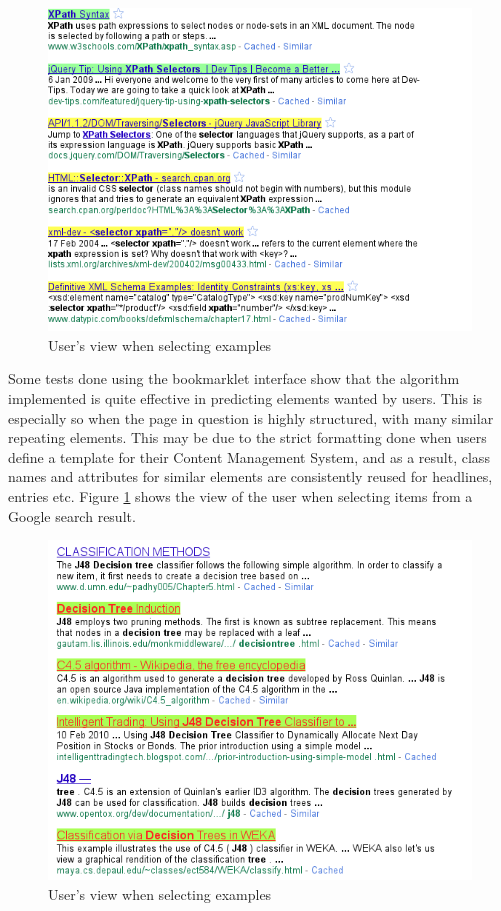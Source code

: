 \documentclass[a4paper,12pt]{article}
\begin{document}
\begin{figure}[htbp]
\centering
\includegraphics[scale=0.5]{selectorexample.png} 
\caption{User's view when selecting examples}
\label{fig:selectorexample}
\end{figure}
Some tests done using the bookmarklet interface show that the algorithm implemented is quite effective in predicting elements wanted by users. This is especially so when the page in question is highly structured, with many similar repeating elements. This may be due to the strict formatting done when users define a template for their Content Management System, and as a result, class names and attributes for similar elements are consistently reused for headlines, entries etc. Figure \ref{fig:selectorexample} shows the view of the user when selecting items from a Google search result.
\begin{figure}[htbp]
\centering
\includegraphics[scale=0.5]{classifierresults.png} 
\caption{User's view when selecting examples}
\label{fig:mlbad}
\end{figure}
\end{document}
